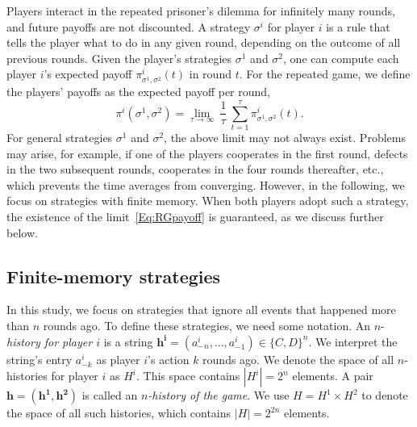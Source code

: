 \documentclass[9pt,twoside,lineno]{pnas-new}
\theoremstyle{plainCl1}
\theoremstyle{plainCl2}
\begin{document}
Players interact in the repeated prisoner's dilemma for infinitely many rounds, and future payoffs are not discounted. 
A strategy $\sigma^i$ for player $i$ is a rule that tells the player what to do in any given round, depending on the outcome of all previous rounds. 
Given the player's strategies $\sigma^1$ and $\sigma^2$, one can compute each player $i$'s expected payoff $\pi^i_{\sigma^1,\sigma^2}(t)$ in round $t$. 
For the repeated game, we define the players' payoffs as the expected payoff per round, 
\begin{equation} \label{Eq:RGpayoff}
\pi^i(\sigma^1,\sigma^2) = \lim_{\tau \to \infty}~ \frac{1}{\tau} ~\sum_{t=1}^{\tau} \pi_{\sigma^1,\sigma^2}^i(t).
\end{equation}
For general strategies $\sigma^1$ and $\sigma^2$, the above limit may not always exist. 
Problems may arise, for example, if one of the players cooperates in the first round, defects in the two subsequent rounds, cooperates in the four rounds thereafter, etc., which prevents the time averages from converging. 
However, in the following, we focus on strategies with finite memory. 
When both players adopt such a strategy, the existence of the limit~\eqref{Eq:RGpayoff} is guaranteed, as we discuss further below.


\subsection{Finite-memory strategies} 


In this study, we focus on strategies that ignore all events that happened more than $n$ rounds ago.
To define these strategies, we need some notation. 
An \(n\)-{\it history for player $i$} is a string \(\mathbf{h^i} \!=\! (a^i_{-n}, \ldots, a^i_{-1})\! \in \!\{C, D\}^n\). 
We interpret the string's entry \(a^i_{-k}\) as player \(i\)'s action \(k\) rounds ago. 
We denote the space of all \(n\)-histories for player \(i\) as \(H^i\). 
This space contains \(|H^i| \!=\! 2^n\) elements. 
A pair \(\mathbf{h} \!=\! (\mathbf{h^1}, \mathbf{h^2})\) is called an {\it \(n\)-history of the game}. 
We use \(H \!=\! H^1 \!\times\! H^2\) to denote the space of all such histories, which contains \(|H| \!=\! 2^{2n}\) elements.\\ 
\end{document}
